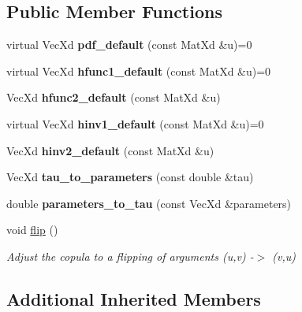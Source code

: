 \subsection*{Public Member Functions}
\begin{DoxyCompactItemize}
\item 
\hypertarget{class_elliptical_bicop_a9d859278685c80465d09dc8fe05b7d3d}{virtual Vec\+Xd {\bfseries pdf\+\_\+default} (const Mat\+Xd \&u)=0}\label{class_elliptical_bicop_a9d859278685c80465d09dc8fe05b7d3d}

\item 
\hypertarget{class_elliptical_bicop_ae4e47a0b9373b0f103b28fbacdaa58b8}{virtual Vec\+Xd {\bfseries hfunc1\+\_\+default} (const Mat\+Xd \&u)=0}\label{class_elliptical_bicop_ae4e47a0b9373b0f103b28fbacdaa58b8}

\item 
\hypertarget{class_elliptical_bicop_a18f5fa85bd6ed14d56e0b269c091ac3b}{Vec\+Xd {\bfseries hfunc2\+\_\+default} (const Mat\+Xd \&u)}\label{class_elliptical_bicop_a18f5fa85bd6ed14d56e0b269c091ac3b}

\item 
\hypertarget{class_elliptical_bicop_aa2a3700bc5dd43aade311985f96077e0}{virtual Vec\+Xd {\bfseries hinv1\+\_\+default} (const Mat\+Xd \&u)=0}\label{class_elliptical_bicop_aa2a3700bc5dd43aade311985f96077e0}

\item 
\hypertarget{class_elliptical_bicop_ac94477889cbd73c30eb7010001e9fec8}{Vec\+Xd {\bfseries hinv2\+\_\+default} (const Mat\+Xd \&u)}\label{class_elliptical_bicop_ac94477889cbd73c30eb7010001e9fec8}

\item 
\hypertarget{class_elliptical_bicop_a4a478ff32dddf4561c8d97041b943e1f}{Vec\+Xd {\bfseries tau\+\_\+to\+\_\+parameters} (const double \&tau)}\label{class_elliptical_bicop_a4a478ff32dddf4561c8d97041b943e1f}

\item 
\hypertarget{class_elliptical_bicop_a45f034c75af02d9b20b4af5c16754e5a}{double {\bfseries parameters\+\_\+to\+\_\+tau} (const Vec\+Xd \&parameters)}\label{class_elliptical_bicop_a45f034c75af02d9b20b4af5c16754e5a}

\item 
\hypertarget{class_elliptical_bicop_a176f55b005e74efe21abd01651ea8967}{void \hyperlink{class_elliptical_bicop_a176f55b005e74efe21abd01651ea8967}{flip} ()}\label{class_elliptical_bicop_a176f55b005e74efe21abd01651ea8967}

\begin{DoxyCompactList}\small\item\em Adjust the copula to a flipping of arguments (u,v) -\/$>$ (v,u) \end{DoxyCompactList}\end{DoxyCompactItemize}
\subsection*{Additional Inherited Members}
